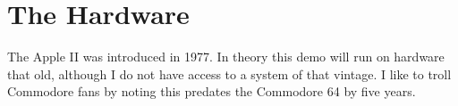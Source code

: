 \documentclass[twocolumn]{article}
\begin{document}






%

\section{The Hardware}

The Apple II was introduced in 1977.
In theory this demo will run on hardware that old, although I do
not have access to a system of that vintage.
I like to troll Commodore fans by noting this predates the Commodore 64 by 
five years.
\end{document}

